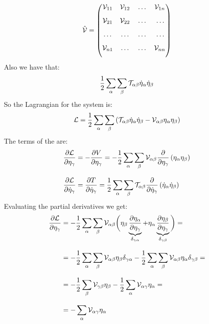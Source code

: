 \begin{equation}
    \hat{\mathcal{V}}=
    \begin{pmatrix}
        \mathcal{V}_{1 1} & \mathcal{V}_{1 2} &  \,\dots\,  & \mathcal{V}_{1 n}\\[8pt]
        \mathcal{V}_{2 1} & \mathcal{V}_{2 2} &  \,\dots\,  &  \,\dots\, \\[8pt]
         \,\dots\,  &  \,\dots\,  &  \,\dots\,  &  \,\dots\, \\[8pt]
        \mathcal{V}_{n 1} &  \,\dots\,  &  \,\dots\,  & \mathcal{V}_{n n}\\[8pt]
    \end{pmatrix}
\end{equation}
Also we have that:
\begin{equation}
    \dfrac{1}{2}\displaystyle\sum_{\alpha}\displaystyle\sum_{\beta}\mathcal{T}_{\alpha \beta}\dot{\eta}_{\alpha}\dot{\eta}_{\beta}
\end{equation}
So the Lagrangian for the system is:
\begin{equation}
    \mathcal{L} = \dfrac{1}{2}\displaystyle\sum_{\alpha}\displaystyle\sum_{\beta}\left(\mathcal{T}_{\alpha \beta}\dot{\eta}_{\alpha}\dot{\eta}_{\beta} - \mathcal{V}_{\alpha \beta}\eta_{\alpha}\eta_{\beta}\right)
\end{equation}
The terms of the \eleref\;are:
\begin{equation}
    \begin{split}
        \pdv{\lagr}{\eta_{\gamma}} &= -\pdv{V}{\eta_{\gamma}} = -\dfrac{1}{2}\bigsum_{\alpha}\bigsum_{\beta}\Velegant_{\alpha \beta} \pdv{}{\eta_{\gamma}}\brackets{\eta_{\alpha}\eta_{\beta}}\\[8pt]
        \pdv{\lagr}{\dot{\eta}_{\gamma}} &= \pdv{T}{\dot{\eta}_{\gamma}} = \dfrac{1}{2}\bigsum_{\alpha}\bigsum_{\beta}\Telegant_{\alpha \beta}\pdv{}{\dot{\eta}_{\gamma}}\brackets{\dot{\eta}_{\alpha}\dot{\eta}_{\beta}}
    \end{split}
\end{equation}
Evaluating the partial derivatives we get:
\begin{equation}
    \begin{split}
        \pdv{\lagr}{\eta_{\gamma}} &= -\dfrac{1}{2}\bigsum_{\alpha}\bigsum_{\beta}\Velegant_{\alpha \beta} \bbrackets{\eta_{\beta}\underbrace{\pdv{\eta_{\alpha}}{\eta_{\gamma}}}_{\delta_{\gamma \alpha}} + \eta_{\alpha}\underbrace{\pdv{\eta_{\beta}}{\eta_{\gamma}}}_{\delta_{\gamma \beta}}} =\\[8pt]
        &= -\dfrac{1}{2}\bigsum_{\alpha}\bigsum_{\beta}\Velegant_{\alpha \beta} \eta_{\beta}\delta_{\gamma \alpha} - \dfrac{1}{2}\bigsum_{\alpha}\bigsum_{\beta}\Velegant_{\alpha \beta} \eta_{\alpha}\delta_{\gamma \beta} = \\[8pt]
        &= -\dfrac{1}{2}\bigsum_{\beta}\Velegant_{\gamma \beta} \eta_{\beta} - \dfrac{1}{2}\bigsum_{\alpha}\Velegant_{\alpha \gamma} \eta_{\alpha} =\\[8pt]
        &= -\bigsum_{\alpha}\Velegant_{\alpha \gamma} \eta_{\alpha}
    \end{split}
\end{equation}
